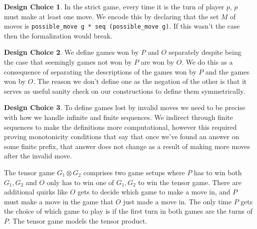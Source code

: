 \documentclass{article}
\theoremstyle{definition}
\newtheorem*{designchoice}{Design Choice}
\begin{document}
\begin{designchoice}
In the strict game, every time it is the turn of player $p$, $p$ must make at least one move. We encode this by declaring that the set $M$ of moves is \verb|possible_move g * seq (possible_move g)|. If this wasn't the case then the formalization would break. 

\end{designchoice}

\begin{designchoice}
We define games won by $P$ and $O$ separately despite being the case that seemingly games not won by $P$ are won by $O$. We do this as a consequence of separating the descriptions of the games won by $P$ and the games won by $O$. The reason we don't define one as the negation of the other is that it serves as useful sanity check on our constructions to define them symmetrically. 
\end{designchoice}

\begin{designchoice}
To define games lost by invalid moves we need to be precise with how we handle infinite and finite sequences. We  indirect through finite sequences to make the definitions more computational, however this required proving monotonicity conditions that say that once we've found an answer on some finite prefix, that answer does not change as a result of making more moves after the invalid move.  
\end{designchoice}

The tensor game $G_1 \otimes G_2$ comprises two game setups where $P$ has to win both $G_1, G_2$ and $O$ only has to win one of $G_1, G_2$ to win the tensor game. There are additional quirks like $O$ gets to decide which game to make a move in, and $P$ must make a move in the game that $O$ just made a move in. The only time $P$ gets the choice of which game to play is if the first turn in both games are the turns of $P$. The tensor game models the tensor product. 
\\
\end{document}
